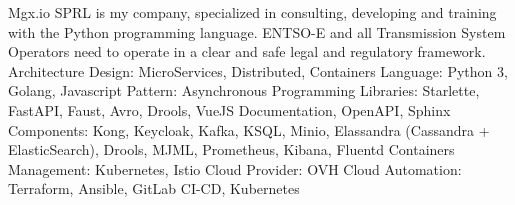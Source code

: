 \documentclass[
  a4paper,
]{fortysecondscv}
\begin{document}
\makefrontsidebar

\begin{cvtable}
    {Mgx.io SPRL is my company, specialized in consulting, developing and training with the Python programming language.}
    {ENTSO-E and all Transmission System Operators need to operate in a clear and safe legal and regulatory framework. 
     Architecture Design: MicroServices, Distributed, Containers
     Language: Python 3, Golang, Javascript
     Pattern: Asynchronous Programming
     Libraries: Starlette, FastAPI, Faust, Avro, Drools, VueJS
     Documentation, OpenAPI, Sphinx
     Components: Kong, Keycloak, Kafka, KSQL, Minio, Elassandra (Cassandra + ElasticSearch), Drools, MJML, Prometheus, Kibana, Fluentd
     Containers Management: Kubernetes, Istio
     Cloud Provider: OVH Cloud
     Automation: Terraform, Ansible, GitLab CI-CD, Kubernetes
    }
\end{cvtable}
\end{document}
